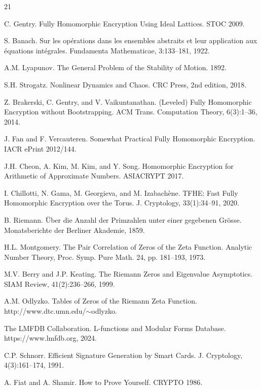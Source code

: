 \documentclass[11pt,a4paper]{article}
\begin{document}
\begin{thebibliography}{21}

 C. Gentry. Fully Homomorphic Encryption Using Ideal Lattices. STOC 2009.

 S. Banach. Sur les op\'erations dans les ensembles abstraits et leur application aux \'equations int\'egrales. Fundamenta Mathematicae, 3:133–181, 1922.

 A.M. Lyapunov. The General Problem of the Stability of Motion. 1892.

 S.H. Strogatz. Nonlinear Dynamics and Chaos. CRC Press, 2nd edition, 2018.

 Z. Brakerski, C. Gentry, and V. Vaikuntanathan. (Leveled) Fully Homomorphic Encryption without Bootstrapping. ACM Trans. Computation Theory, 6(3):1–36, 2014.

 J. Fan and F. Vercauteren. Somewhat Practical Fully Homomorphic Encryption. IACR ePrint 2012/144.

 J.H. Cheon, A. Kim, M. Kim, and Y. Song. Homomorphic Encryption for Arithmetic of Approximate Numbers. ASIACRYPT 2017.

 I. Chillotti, N. Gama, M. Georgieva, and M. Izabach\`ene. TFHE: Fast Fully Homomorphic Encryption over the Torus. J. Cryptology, 33(1):34–91, 2020.

 B. Riemann. \"Uber die Anzahl der Primzahlen unter einer gegebenen Gr\"osse. Monatsberichte der Berliner Akademie, 1859.

 H.L. Montgomery. The Pair Correlation of Zeros of the Zeta Function. Analytic Number Theory, Proc. Symp. Pure Math. 24, pp. 181–193, 1973.

 M.V. Berry and J.P. Keating. The Riemann Zeros and Eigenvalue Asymptotics. SIAM Review, 41(2):236–266, 1999.

 A.M. Odlyzko. Tables of Zeros of the Riemann Zeta Function. http://www.dtc.umn.edu/$\sim$odlyzko.

 The LMFDB Collaboration. L-functions and Modular Forms Database. https://www.lmfdb.org, 2024.

 C.P. Schnorr. Efficient Signature Generation by Smart Cards. J. Cryptology, 4(3):161–174, 1991.

 A. Fiat and A. Shamir. How to Prove Yourself. CRYPTO 1986.


\end{thebibliography}
\end{document}

